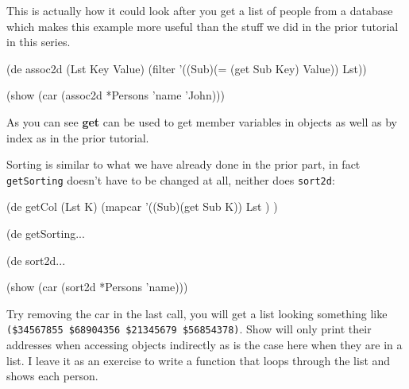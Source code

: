 This is actually how it could look after you get a list of people from a
database which makes this example more useful than the stuff we did in
the prior tutorial in this series.


\begin{wideverbatim}
(de assoc2d (Lst Key Value)
    (filter '((Sub)(= (get Sub Key) Value)) Lst))

(show (car (assoc2d *Persons 'name 'John)))
\end{wideverbatim}

As you can see \textbf{get} can be used to get member variables in objects as
well as by index as in the prior tutorial.

Sorting is similar to what we have already done in the prior part, in
fact \texttt{getSorting} doesn't have to be changed at all, neither
does \texttt{sort2d}:


\begin{wideverbatim}
(de getCol (Lst K) 
    (mapcar '((Sub)(get Sub K)) Lst ) ) 

(de getSorting...

(de sort2d...

(show (car (sort2d *Persons 'name)))
\end{wideverbatim}

Try removing the car in the last call, you will get a list looking
something like \texttt{(\$34567855 \$68904356 \$21345679 \$56854378)}.
Show will only print their addresses when accessing objects indirectly
as is the case here when they are in a list. I leave it as an exercise
to write a function that loops through the list and shows each person.


